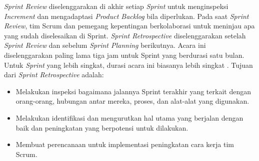 \par \textit{Sprint Review} diselenggarakan di akhir setiap \textit{Sprint} untuk menginspeksi \textit{Increment} dan mengadaptasi \textit{Product Backlog} bila diperlukan. Pada saat \textit{Sprint Review}, tim Scrum dan pemegang kepentingan berkolaborasi untuk meninjau apa yang sudah   diselesaikan di Sprint. \textit{Sprint Retrospective} diselenggarakan setelah \textit{Sprint Review} dan sebelum \textit{Sprint Planning} berikutnya. Acara ini diselenggarakan paling lama tiga jam untuk Sprint yang berdurasi satu bulan. Untuk \textit{Sprint} yang lebih singkat, durasi acara ini biasanya lebih singkat \citep{panduanScrum}. Tujuan dari \textit{Sprint Retrospective} adalah:
\begin{itemize}
	\itemsep0em
	\item Melakukan inspeksi bagaimana jalannya Sprint terakhir yang terkait dengan orang-orang, hubungan antar mereka, proses, dan alat-alat yang digunakan.
	\item Melakukan identifikasi dan mengurutkan hal utama yang berjalan dengan baik dan peningkatan yang berpotensi untuk dilakukan.
	\item Membuat perencanaan untuk implementasi peningkatan cara kerja tim Scrum.
\end{itemize}
 

